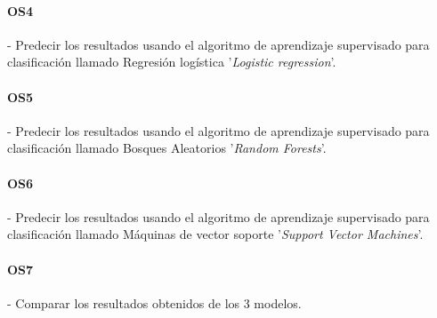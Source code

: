 \label{os:OS4}
\paragraph{OS4} - Predecir los resultados usando el algoritmo de aprendizaje supervisado para clasificación llamado Regresión logística '\textit{Logistic regression}'.

\label{os:OS5}
\paragraph{OS5} - Predecir los resultados usando el algoritmo de aprendizaje supervisado para clasificación llamado Bosques Aleatorios '\textit{Random Forests}'.

\label{os:OS6}
\paragraph{OS6} - Predecir los resultados usando el algoritmo de aprendizaje supervisado para clasificación llamado Máquinas de vector soporte '\textit{Support Vector Machines}'.

\label{os:OS7}
\paragraph{OS7} - Comparar los resultados obtenidos de los 3 modelos.